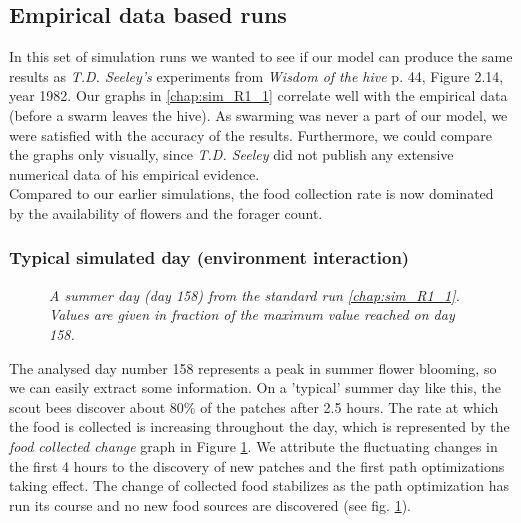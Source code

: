 \subsection{Empirical data based runs}
	In this set of simulation runs we wanted to see if our model can produce the same results as \textit{T.D. Seeley's} experiments from \textit{Wisdom of the hive} p. 44, Figure  2.14, year 1982. Our graphs in \ref{chap:sim_R1_1} correlate well with the empirical data (before a swarm leaves the hive). As swarming was never a part of our model, we were satisfied with the accuracy of the results. Furthermore, we could compare the graphs only visually, since \textit{T.D. Seeley} did not publish any  extensive numerical data of his empirical evidence.\\
	Compared to our earlier simulations, the food collection rate is now dominated by the availability of flowers and the forager count.
	
	\subsubsection{Typical simulated day (environment interaction)}
	
					\begin{figure}[H]
						\centering
						\caption{\textit{A summer day (day 158) from the standard run \ref{chap:sim_R1_1}. Values are given in fraction of the maximum value reached on day 158.}}
						\label{fig:day158}
					\end{figure}
					
		The analysed day number 158 represents a peak in summer flower blooming, so we can easily extract some information. On a 'typical' summer day like this, the scout bees discover about $80\%$ of the patches after 2.5 hours. The rate at which the food is collected is increasing throughout the day, which is represented by the \textit{food collected change} graph in Figure \ref{fig:day158}. We attribute the fluctuating changes in the first 4 hours to the discovery of new patches and the first path optimizations taking effect. The change of collected food stabilizes as the path optimization has run its course and no new food sources are discovered (see fig. \ref{fig:day158}).\\
		

